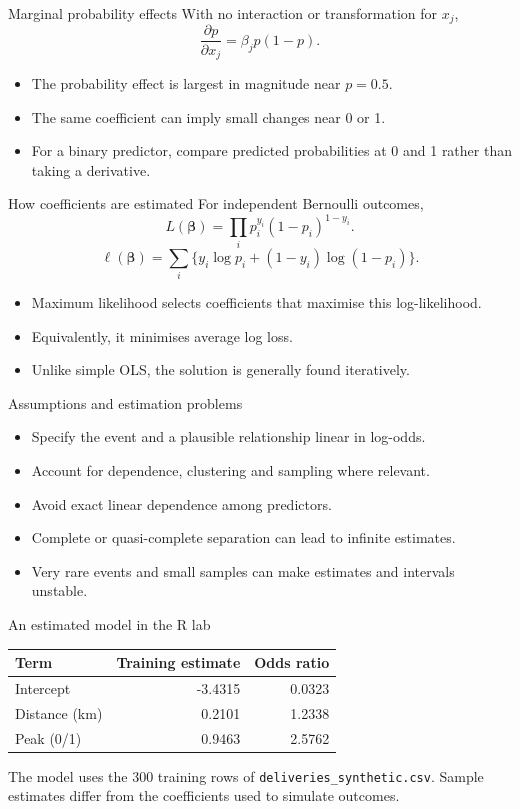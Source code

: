 \begin{frame}{Marginal probability effects}
With no interaction or transformation for $x_j$,\[\frac{\partial p}{\partial x_j}=\beta_jp(1-p).\]\begin{itemize}
\item The probability effect is largest in magnitude near $p=0.5$.
\item The same coefficient can imply small changes near 0 or 1.
\item For a binary predictor, compare predicted probabilities at 0 and 1 rather than taking a derivative.
\end{itemize}
\end{frame}

\begin{frame}{How coefficients are estimated}
For independent Bernoulli outcomes,\[L(\boldsymbol\beta)=\prod_i p_i^{y_i}(1-p_i)^{1-y_i}.\]\[\ell(\boldsymbol\beta)=\sum_i\{y_i\log p_i+(1-y_i)\log(1-p_i)\}.\]\begin{itemize}
\item Maximum likelihood selects coefficients that maximise this log-likelihood.
\item Equivalently, it minimises average log loss.
\item Unlike simple OLS, the solution is generally found iteratively.
\end{itemize}
\end{frame}

\begin{frame}{Assumptions and estimation problems}
\begin{itemize}
\item Specify the event and a plausible relationship linear in log-odds.
\item Account for dependence, clustering and sampling where relevant.
\item Avoid exact linear dependence among predictors.
\item Complete or quasi-complete separation can lead to infinite estimates.
\item Very rare events and small samples can make estimates and intervals unstable.
\end{itemize}
\end{frame}

\begin{frame}{An estimated model in the R lab}
\begin{center}\begin{tabular}{lrr}\toprule
Term & Training estimate & Odds ratio\\\midrule Intercept & -3.4315 & 0.0323\\ Distance (km) & 0.2101 & 1.2338\\ Peak (0/1) & 0.9463 & 2.5762\\
\bottomrule\end{tabular}\end{center}The model uses the 300 training rows of \texttt{deliveries\_synthetic.csv}. Sample estimates differ from the coefficients used to simulate outcomes.
\end{frame}

